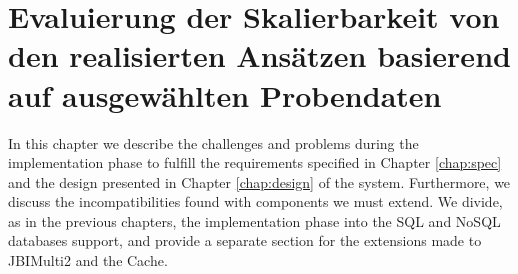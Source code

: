 \chapter{Evaluierung der Skalierbarkeit von den realisierten Ansätzen basierend auf ausgewählten Probendaten}
\label{chap:Evaluierung}

In this chapter we describe the challenges and problems during the implementation phase to fulfill the requirements specified in Chapter \ref{chap:spec} and the design presented in Chapter \ref{chap:design} of the system. Furthermore, we discuss the incompatibilities found with components we must extend. We divide, as in the previous chapters, the implementation phase into the \ac{SQL} and \ac{NoSQL} databases support, and provide a separate section for the extensions made to JBIMulti2 and the Cache. 



